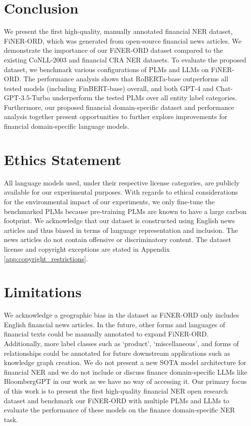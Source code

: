 \documentclass[11pt]{article}
\begin{document}
\section{Conclusion}
We present the first high-quality, manually annotated financial NER dataset, FiNER-ORD, which was generated from open-source financial news articles. We demonstrate the importance of our FiNER-ORD dataset compared to the existing CoNLL-2003 and financial CRA NER datasets. To evaluate the proposed dataset, we benchmark various configurations of PLMs and LLMs on FiNER-ORD. The performance analysis shows that RoBERTa-base outperforms all tested models (including FinBERT-base) overall, and both GPT-4 and Chat-GPT-3.5-Turbo underperform the tested PLMs over all entity label categories. Furthermore, our proposed financial domain-specific dataset and performance analysis together present opportunities to further explore improvements for financial domain-specific language models.

\section*{Ethics Statement}
All language models used, under their respective license categories, are publicly available for our experimental purposes. With regards to ethical considerations for the environmental impact of our experiments, we only fine-tune the benchmarked PLMs because pre-training PLMs are known to have a large carbon footprint. We acknowledge that our dataset is constructed using English news articles and thus biased in terms of language representation and inclusion. The news articles do not contain offensive or discriminatory content. The dataset license and copyright exceptions are stated in Appendix \ref{app:copyright_restrictions}.

\section*{Limitations}
We acknowledge a geographic bias in the dataset as FiNER-ORD only includes English financial news articles. In the future, other forms and languages of financial texts could be manually annotated to expand FiNER-ORD. Additionally, more label classes such as `product', `miscellaneous', and forms of relationships could be annotated for future downstream applications such as knowledge graph creation. We do not present a new SOTA model architecture for financial NER and we do not include or discuss finance domain-specific LLMs
like BloombergGPT \cite{wu2023Bloomberg} in our work as we have no way of accessing it. Our primary focus of this work is to present the first high-quality financial NER open research dataset and benchmark our FiNER-ORD with multiple PLMs and LLMs to evaluate the performance of these models on the finance domain-specific NER task.
\end{document}

